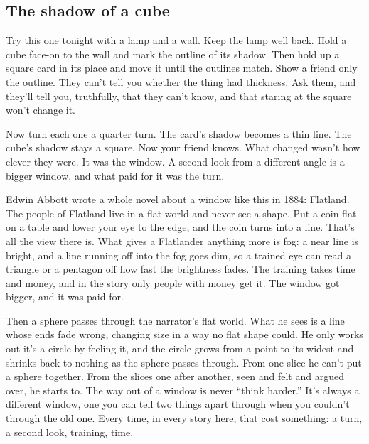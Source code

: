 \documentclass[11pt,twoside]{article}
\theoremstyle{thielethm}
\theoremstyle{thieledef}
\theoremstyle{thieledef}
\theoremstyle{thieledef}
\theoremstyle{thielethm}
\theoremstyle{thieleobs}
\theoremstyle{thielethm}
\begin{document}
\subsection{The shadow of a cube}

Try this one tonight with a lamp and a wall. Keep the lamp well back. Hold a cube face-on to the wall and mark the outline of its shadow. Then hold up a square card in its place and move it until the outlines match. Show a friend only the outline. They can't tell you whether the thing had thickness. Ask them, and they'll tell you, truthfully, that they can't know, and that staring at the square won't change it.

Now turn each one a quarter turn. The card's shadow becomes a thin line. The cube's shadow stays a square. Now your friend knows. What changed wasn't how clever they were. It was the window. A second look from a different angle is a bigger window, and what paid for it was the turn.

Edwin Abbott wrote a whole novel about a window like this in 1884: Flatland. The people of Flatland live in a flat world and never see a shape. Put a coin flat on a table and lower your eye to the edge, and the coin turns into a line. That's all the view there is. What gives a Flatlander anything more is fog: a near line is bright, and a line running off into the fog goes dim, so a trained eye can read a triangle or a pentagon off how fast the brightness fades. The training takes time and money, and in the story only people with money get it. The window got bigger, and it was paid for.

Then a sphere passes through the narrator's flat world. What he sees is a line whose ends fade wrong, changing size in a way no flat shape could. He only works out it's a circle by feeling it, and the circle grows from a point to its widest and shrinks back to nothing as the sphere passes through. From one slice he can't put a sphere together. From the slices one after another, seen and felt and argued over, he starts to. The way out of a window is never ``think harder.'' It's always a different window, one you can tell two things apart through when you couldn't through the old one. Every time, in every story here, that cost something: a turn, a second look, training, time.
\end{document}
